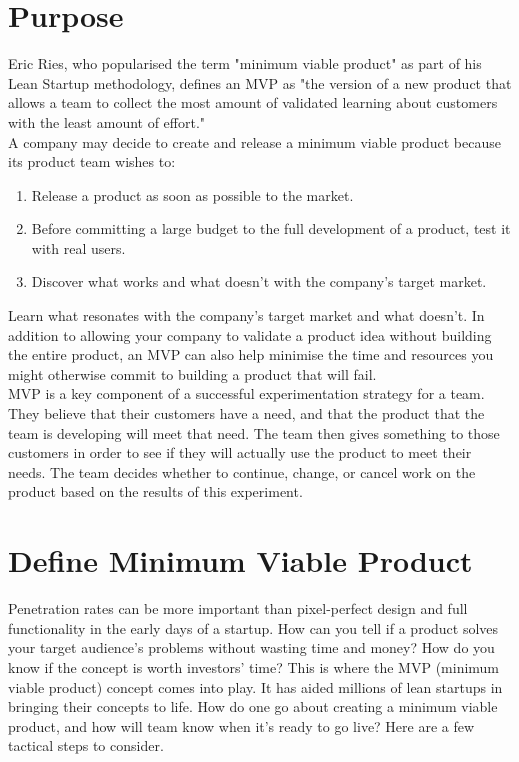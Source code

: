 \documentclass[paper=a4, fontsize=11pt]{scrartcl}
\numberwithin{equation}{section}		%
\numberwithin{figure}{section}			%
\numberwithin{table}{section}				%
\begin{document}
\newpage

\section{Purpose}
Eric Ries, who popularised the term "minimum viable product" as part of his Lean Startup methodology, defines an MVP as "the version of a new product that allows a team to collect the most amount of validated learning about customers with the least amount of effort."\\
A company may decide to create and release a minimum viable product because its product team wishes to:
\begin{enumerate}
    \item Release a product as soon as possible to the market.
    \item Before committing a large budget to the full development of a product, test it with real users.
    \item Discover what works and what doesn't with the company's target market.
\end{enumerate}

Learn what resonates with the company's target market and what doesn't. In addition to allowing your company to validate a product idea without building the entire product, an MVP can also help minimise the time and resources you might otherwise commit to building a product that will fail.\\
MVP is a key component of a successful experimentation strategy for a team. They believe that their customers have a need, and that the product that the team is developing will meet that need. The team then gives something to those customers in order to see if they will actually use the product to meet their needs. The team decides whether to continue, change, or cancel work on the product based on the results of this experiment.
\pagebreak

\section{Define Minimum Viable Product}
Penetration rates can be more important than pixel-perfect design and full functionality in the early days of a startup. How can you tell if a product solves your target audience's problems without wasting time and money? How do you know if the concept is worth investors' time? This is where the MVP (minimum viable product) concept comes into play. It has aided millions of lean startups in bringing their concepts to life.
How do one go about creating a minimum viable product, and how will team know when it's ready to go live? Here are a few tactical steps to consider.
\end{document}
